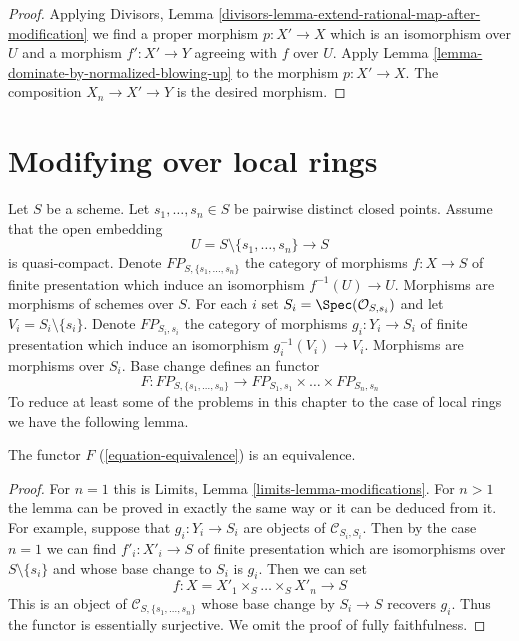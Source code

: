 \begin{proof}
Applying
Divisors, Lemma \ref{divisors-lemma-extend-rational-map-after-modification}
we find a proper morphism $p : X' \to X$ which is an isomorphism
over $U$ and a morphism $f' : X' \to Y$ agreeing with $f$ over $U$.
Apply Lemma \ref{lemma-dominate-by-normalized-blowing-up}
to the morphism $p : X' \to X$. The composition $X_n \to X' \to Y$ is
the desired morphism.
\end{proof}





\section{Modifying over local rings}
\label{section-modifications}

\noindent
Let $S$ be a scheme. Let $s_1, \ldots, s_n \in S$ be pairwise distinct
closed points. Assume that the open embedding
$$
U = S \setminus \{s_1, \ldots, s_n\} \longrightarrow S
$$
is quasi-compact. Denote $FP_{S, \{s_1, \ldots, s_n\}}$
the category of morphisms $f : X \to S$ of finite presentation
which induce an isomorphism $f^{-1}(U) \to U$.
Morphisms are morphisms of schemes over $S$.
For each $i$ set $S_i = \Spec(\mathcal{O}_{S, s_i})$
and let $V_i = S_i \setminus \{s_i\}$. Denote
$FP_{S_i, s_i}$ the category of
morphisms $g_i : Y_i \to S_i$ of finite presentation which induce an
isomorphism $g_i^{-1}(V_i) \to V_i$.
Morphisms are morphisms over $S_i$.
Base change defines an functor
\begin{equation}
\label{equation-equivalence}
F :
FP_{S, \{s_1, \ldots, s_n\}}
\longrightarrow
FP_{S_1, s_1} \times \ldots \times FP_{S_n, s_n}
\end{equation}
To reduce at least some of the problems in this chapter to the case
of local rings we have the following lemma.

\begin{lemma}
\label{lemma-equivalence}
The functor $F$ (\ref{equation-equivalence}) is an equivalence.
\end{lemma}

\begin{proof}
For $n = 1$ this is Limits, Lemma \ref{limits-lemma-modifications}.
For $n > 1$ the lemma can be proved in exactly the same way or it
can be deduced from it. For example, suppose that
$g_i : Y_i \to S_i$ are objects of $\mathcal{C}_{S_i, S_i}$.
Then by the case $n = 1$ we can find $f'_i : X'_i \to S$
of finite presentation
which are isomorphisms over $S \setminus \{s_i\}$ and whose
base change to $S_i$ is $g_i$. Then we can set
$$
f : X = X'_1 \times_S \ldots \times_S X'_n \to S
$$
This is an object of $\mathcal{C}_{S, \{s_1, \ldots, s_n\}}$
whose base change by $S_i \to S$ recovers $g_i$. Thus the functor
is essentially surjective. We omit the proof of
fully faithfulness.
\end{proof}

